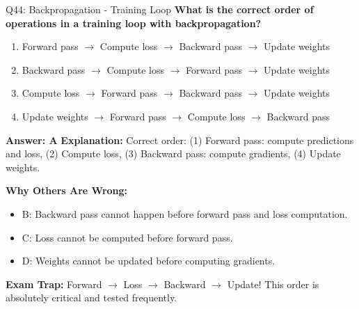 \documentclass[8pt]{beamer}
\begin{document}
	\begin{frame}{Q44: Backpropagation - Training Loop}
		\fontsize{6.5}{7.5}\selectfont
		\textbf{What is the correct order of operations in a training loop with backpropagation?}
		
		\begin{enumerate}
			\item Forward pass $\to$ Compute loss $\to$ Backward pass $\to$ Update weights
			\item Backward pass $\to$ Compute loss $\to$ Forward pass $\to$ Update weights
			\item Compute loss $\to$ Forward pass $\to$ Backward pass $\to$ Update weights
			\item Update weights $\to$ Forward pass $\to$ Compute loss $\to$ Backward pass
		\end{enumerate}
		
		\vspace{0.05cm}
		\textcolor{myblue}{\textbf{Answer: A}}
		\vspace{0.05cm}
		\textcolor{myblue}{\textbf{Explanation:}} Correct order: (1) Forward pass: compute predictions and loss, (2) Compute loss, (3) Backward pass: compute gradients, (4) Update weights.
		
		\vspace{0.05cm}
		\textcolor{myred}{\textbf{Why Others Are Wrong:}}
		\begin{itemize}
			\item \textcolor{myred}{B:} Backward pass cannot happen before forward pass and loss computation.
			\item \textcolor{myred}{C:} Loss cannot be computed before forward pass.
			\item \textcolor{myred}{D:} Weights cannot be updated before computing gradients.
		\end{itemize}
		
		\textcolor{myred}{\textbf{Exam Trap:}} Forward $\to$ Loss $\to$ Backward $\to$ Update! This order is absolutely critical and tested frequently.
	\end{frame}
	
\end{document}
